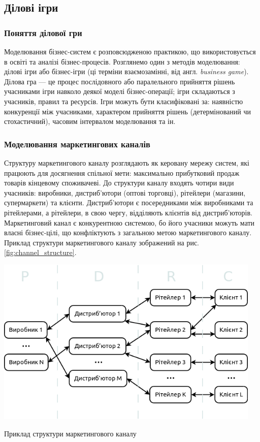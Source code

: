     \subsection{Ділові ігри}
        \subsubsection{Поняття ділової гри}
Моделювання бізнес-систем є розповсюдженою практикою, що використовується в освіті та аналізі бізнес-процесів. Розглянемо один з методів моделювання: ділові ігри або бізнес-ігри (ці терміни взаємозамінні, від англ. {\it business game}). Ділова гра --- це процес послідовного або паралельного прийняття рішень учасниками ігри навколо деякої моделі бізнес-операції; ігри складаються з учасників, правил та ресурсів\cite{bg1, bg2}. Ігри можуть бути класифіковані за\cite{bg3}: наявністю конкуренції між учасниками, характером прийняття рішень (детермінований чи стохастичний), часовим інтервалом моделювання та ін.
        
        \subsubsection{Моделювання маркетингових каналів}
Структуру маркетингового каналу розглядають як керовану мережу систем, які працюють для досягнення спільної мети\cite{stern}: 
максимально прибутковий продаж товарів кінцевому споживачеві. До структури каналу входять чотири види учасників: виробники, дистриб’ютори (оптові торговці), рітейлери (магазини, супермаркети) та клієнти. Дистриб’ютори є посередниками між виробниками та рітейлерами, а рітейлери, в свою чергу, відділяють клієнтів від дистриб’юторів. Маркетинговий канал є конкурентною системою, бо його учасники можуть мати власні бізнес-цілі, що конфліктують з загальною метою маркетингового каналу. Приклад структури маркетингового каналу зображений на рис. \ref{fig:channel_structure}.

            \begin{stdfigure}
                \includegraphics[width=5in]{images/channel_structure.png}
                \caption{Приклад структури маркетингового каналу}
                \label{fig:channel_structure}
            \end{stdfigure}    

